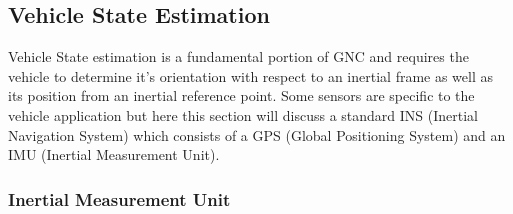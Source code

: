 \documentclass{article}
\begin{document}
\subsection{Vehicle State Estimation}

Vehicle State estimation is a fundamental portion of GNC and
requires the vehicle to determine it's orientation with respect to an
inertial frame as well as its position from an inertial reference
point. Some sensors are specific to the vehicle application but here
this section will discuss a standard INS (Inertial Navigation System)
which consists of a GPS (Global Positioning System) and an IMU
(Inertial Measurement Unit).

\subsubsection{Inertial Measurement Unit}
\end{document}
